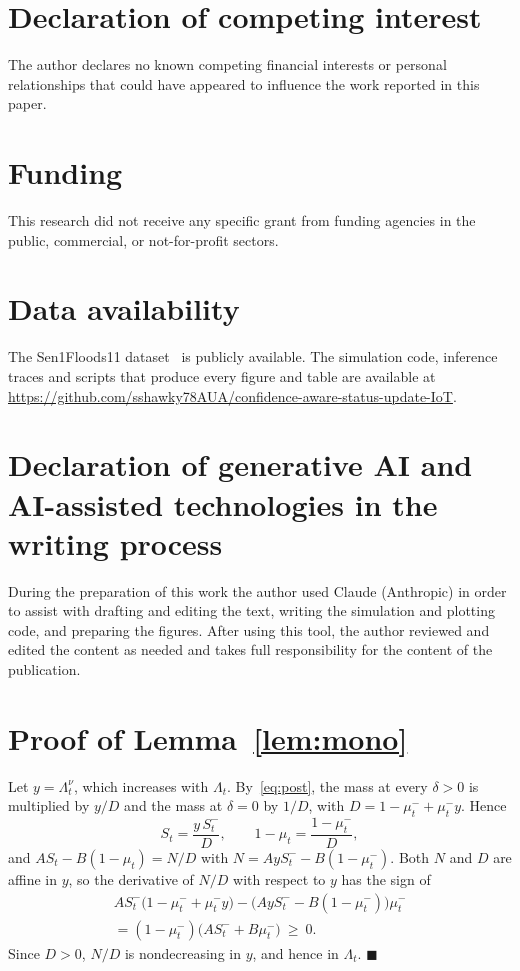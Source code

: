\documentclass[5p,twocolumn]{elsarticle}
\theoremstyle{remark}
\begin{document}
\section*{Declaration of competing interest}
The author declares no known competing financial interests or personal relationships that could have appeared to influence the work reported in this paper.

\section*{Funding}
This research did not receive any specific grant from funding agencies in the public, commercial, or not-for-profit sectors.

\section*{Data availability}
The Sen1Floods11 dataset~\cite{bonafilia2020sen1floods11} is publicly available. The simulation code, inference traces and scripts that produce every figure and table are available at \url{https://github.com/sshawky78AUA/confidence-aware-status-update-IoT}.

\section*{Declaration of generative AI and AI-assisted technologies in the writing process}
During the preparation of this work the author used Claude (Anthropic) in order to assist with drafting and editing the text, writing the simulation and plotting code, and preparing the figures. After using this tool, the author reviewed and edited the content as needed and takes full responsibility for the content of the publication.

\appendix
\section{Proof of Lemma~\ref{lem:mono}}\label{app:mono}
Let $y=\Lambda_t^{\nu}$, which increases with $\Lambda_t$. By~\eqref{eq:post}, the mass at every $\delta>0$ is multiplied by $y/D$ and the mass at $\delta=0$ by $1/D$, with $D=1-\mu^-_t+\mu^-_ty$. Hence
\[
S_t=\frac{y\,S^-_t}{D},\qquad 1-\mu_t=\frac{1-\mu^-_t}{D},
\]
and $AS_t-B(1-\mu_t)=N/D$ with $N=AyS^-_t-B(1-\mu^-_t)$. Both $N$ and $D$ are affine in $y$, so the derivative of $N/D$ with respect to $y$ has the sign of
\begin{multline*}
AS^-_t\big(1-\mu^-_t+\mu^-_ty\big)-\big(AyS^-_t-B(1-\mu^-_t)\big)\mu^-_t\\
=(1-\mu^-_t)\big(AS^-_t+B\mu^-_t\big)\ \ge\ 0.
\end{multline*}
Since $D>0$, $N/D$ is nondecreasing in $y$, and hence in $\Lambda_t$. \hfill$\blacksquare$
\end{document}
